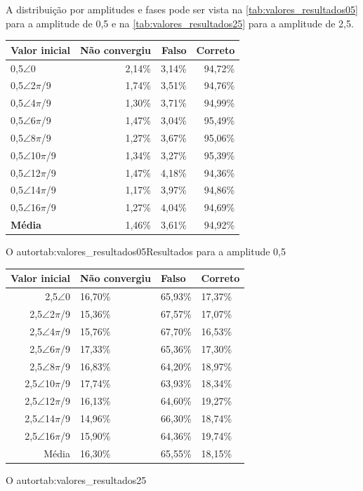A distribuição por amplitudes e fases pode ser vista na \autoref{tab:valores_resultados05} para a amplitude de 0,5 e na \autoref{tab:valores_resultados25} para a amplitude de 2,5.
{
\begin{tabular}{l|r|r|r}
    \hline
    \textbf{Valor inicial} & \textbf{Não convergiu} & \textbf{Falso} & \textbf{Correto} \\ \hline
    0,5$\angle$0 & 2,14\% & 3,14\% & 94,72\% \\ \hline
    0,5$\angle$2$\pi$/9 & 1,74\% & 3,51\% & 94,76\% \\ \hline
    0,5$\angle$4$\pi$/9 & 1,30\% & 3,71\% & 94,99\% \\ \hline
    0,5$\angle$6$\pi$/9 & 1,47\% & 3,04\% & 95,49\% \\ \hline
    0,5$\angle$8$\pi$/9 & 1,27\% & 3,67\% & 95,06\% \\ \hline
    0,5$\angle$10$\pi$/9 & 1,34\% & 3,27\% & 95,39\% \\ \hline
    0,5$\angle$12$\pi$/9 & 1,47\% & 4,18\% & 94,36\% \\ \hline
    0,5$\angle$14$\pi$/9 & 1,17\% & 3,97\% & 94,86\% \\ \hline
    0,5$\angle$16$\pi$/9 & 1,27\% & 4,04\% & 94,69\% \\ \hline
    \textbf{Média} & 1,46\% & 3,61\% & 94,92\% \\ \hline
    \end{tabular}
\label{tab:valores_resultados05}
}
{O autor}{tab:valores_resultados05}{}{Resultados para a amplitude 0,5}
{
\begin{tabular}{r|l|l|l}
    \hline
        Valor inicial & Não convergiu & Falso & Correto \\ \hline
        2,5$\angle$0 & 16,70\% & 65,93\% & 17,37\% \\ \hline
        2,5$\angle$2$\pi$/9 & 15,36\% & 67,57\% & 17,07\% \\ \hline
        2,5$\angle$4$\pi$/9 & 15,76\% & 67,70\% & 16,53\% \\ \hline
        2,5$\angle$6$\pi$/9 & 17,33\% & 65,36\% & 17,30\% \\ \hline
        2,5$\angle$8$\pi$/9 & 16,83\% & 64,20\% & 18,97\% \\ \hline
        2,5$\angle$10$\pi$/9 & 17,74\% & 63,93\% & 18,34\% \\ \hline
        2,5$\angle$12$\pi$/9 & 16,13\% & 64,60\% & 19,27\% \\ \hline
        2,5$\angle$14$\pi$/9 & 14,96\% & 66,30\% & 18,74\% \\ \hline
        2,5$\angle$16$\pi$/9 & 15,90\% & 64,36\% & 19,74\% \\ \hline
        Média & 16,30\% & 65,55\% & 18,15\% \\ \hline
    \end{tabular}
\label{tab:valores_resultados25}
}
{O autor}{tab:valores_resultados25}{}{}


